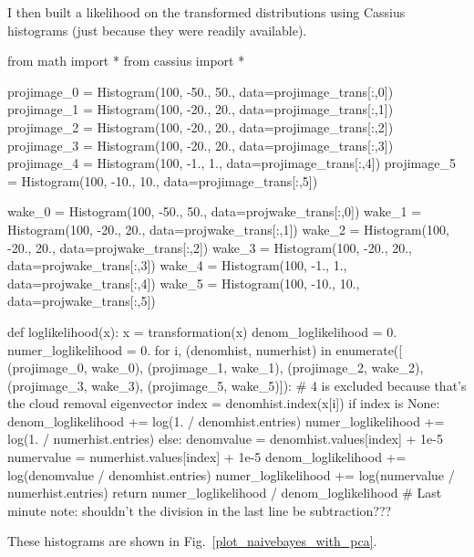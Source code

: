 \documentclass[12pt]{article}
\begin{document}
I then built a likelihood on the transformed distributions using
Cassius histograms (just because they were readily available).
\begin{python}
from math import *
from cassius import *

projimage_0 = Histogram(100, -50., 50., data=projimage_trans[:,0])
projimage_1 = Histogram(100, -20., 20., data=projimage_trans[:,1])
projimage_2 = Histogram(100, -20., 20., data=projimage_trans[:,2])
projimage_3 = Histogram(100, -20., 20., data=projimage_trans[:,3])
projimage_4 = Histogram(100, -1., 1., data=projimage_trans[:,4])
projimage_5 = Histogram(100, -10., 10., data=projimage_trans[:,5])

wake_0 = Histogram(100, -50., 50., data=projwake_trans[:,0])
wake_1 = Histogram(100, -20., 20., data=projwake_trans[:,1])
wake_2 = Histogram(100, -20., 20., data=projwake_trans[:,2])
wake_3 = Histogram(100, -20., 20., data=projwake_trans[:,3])
wake_4 = Histogram(100, -1., 1., data=projwake_trans[:,4])
wake_5 = Histogram(100, -10., 10., data=projwake_trans[:,5])

def loglikelihood(x):
    x = transformation(x)
    denom_loglikelihood = 0.
    numer_loglikelihood = 0.
    for i, (denomhist, numerhist) in enumerate([
            (projimage_0, wake_0), (projimage_1, wake_1), (projimage_2, wake_2),
            (projimage_3, wake_3), (projimage_5, wake_5)]):
            # 4 is excluded because that's the cloud removal eigenvector
        index = denomhist.index(x[i])
        if index is None:
            denom_loglikelihood += log(1. / denomhist.entries)
            numer_loglikelihood += log(1. / numerhist.entries)
        else:
            denomvalue = denomhist.values[index] + 1e-5
            numervalue = numerhist.values[index] + 1e-5
            denom_loglikelihood += log(denomvalue / denomhist.entries)
            numer_loglikelihood += log(numervalue / numerhist.entries)
    return numer_loglikelihood / denom_loglikelihood
    # Last minute note: shouldn't the division in the last line be subtraction???
\end{python}

These histograms are shown in Fig.~\ref{plot_naivebayes_with_pca}.
\end{document}
